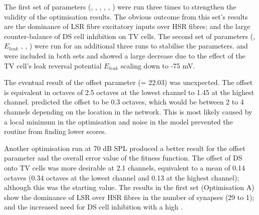 The first set of parameters (\nDSTV, \wDSTV, \nLSRTV, \nHSRTV, \wLSRTV, \wHSRTV)
were run three times to strengthen the validity of the optimisation results. The
obvious outcome from this set's results are the dominance of LSR fibre
excitatory inputs over HSR fibres; and the large counter-balance of DS cell
inhibition on TV cells. The second set of parameters (\sDSTV, $E_{leak}$ \oDSTV,
\nDSTV, \wDSTV) were run for an additional three runs to stabilise the \DSTV
parameters.  \nDSTV and \wDSTV were included in both sets and showed a large
decrease due to the effect of the TV cell's leak reversal potential $E_{leak}$
scaling down to -75 mV\@.  


The eventual result of the offset parameter (\oDSTV = 22.03) was unexpected. The
offset is equivalent in octaves of 2.5 octaves at the lowest channel to 1.45 at
the highest channel. \citet{ReissYoung:2005} predicted the offset to be 0.3
octaves, which would be between 2 to 4 channels depending on the location in the
network. This is most likely caused by a local minimum in the optimisation and
noise in the model prevented the routine from finding lower scores.


Another optimisation run at 70 dB SPL produced a better result for the offset
parameter and the overall error value of the fitness function.  The offset of DS
onto TV cells was more desirable at 2.1 channels, equivalent to a mean of 0.14
octaves (0.34 octaves at the lowest channel and 0.13 at the highest channel);
although this was the starting value.  The results in the first set
(Optimisation A) show the dominance of LSR over HSR fibres in the number of
synapses (29 to 1); and the increased need for DS cell inhibition with a high
\nDSTV.


